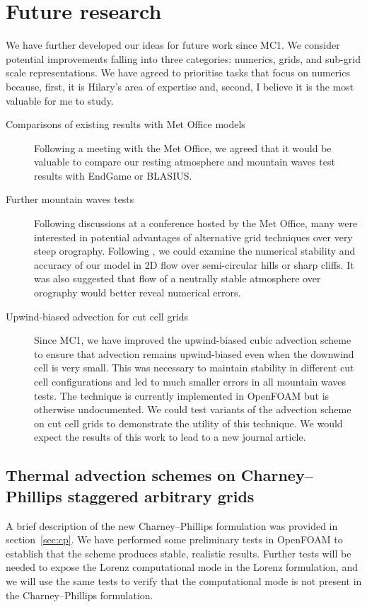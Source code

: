 \documentclass[a4paper]{article}
\begin{document}
\section{Future research}

We have further developed our ideas for future work since MC1.  We consider potential improvements falling into three categories: numerics, grids, and sub-grid scale representations.  We have agreed to prioritise tasks that focus on numerics because, first, it is Hilary's area of expertise and, second, I believe it is the most valuable for me to study.

\begin{description}
	\item[Comparisons of existing results with Met Office models]{Following a meeting with the Met Office, we agreed that it would be valuable to compare our resting atmosphere and mountain waves test results with EndGame or BLASIUS.}
	\item[Further mountain waves tests]{Following discussions at a conference hosted by the Met Office, many were interested in potential advantages of alternative grid techniques over very steep orography.  Following \citet{yamazaki-satomura2010}, we could examine the numerical stability and accuracy of our model in 2D flow over semi-circular hills or sharp cliffs.  It was also suggested that flow of a neutrally stable atmosphere over orography would better reveal numerical errors.}
	\item[Upwind-biased advection for cut cell grids]{Since MC1, we have improved the upwind-biased cubic advection scheme to ensure that advection remains upwind-biased even when the downwind cell is very small.  This was necessary to maintain stability in different cut cell configurations and led to much smaller errors in all mountain waves tests.  The technique is currently implemented in OpenFOAM but is otherwise undocumented.  We could test variants of the advection scheme on cut cell grids to demonstrate the utility of this technique.  We would expect the results of this work to lead to a new journal article.}
\end{description}

\subsection*{Thermal advection schemes on Charney--Phillips staggered arbitrary grids}
A brief description of the new Charney--Phillips formulation was provided in section~\ref{sec:cp}.  We have performed some preliminary tests in OpenFOAM to establish that the scheme produces stable, realistic results.  Further tests will be needed to expose the Lorenz computational mode in the Lorenz formulation, and we will use the same tests to verify that the computational mode is not present in the Charney--Phillips formulation.
		
\end{document}
